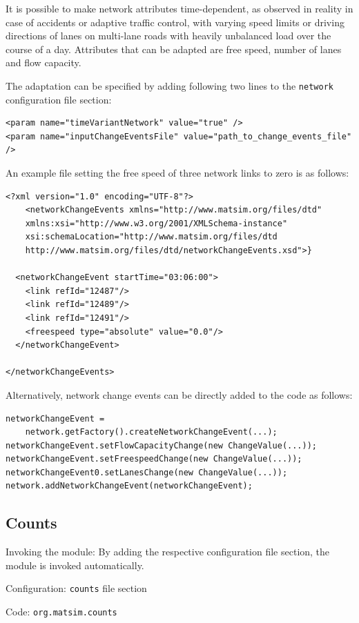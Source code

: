 It is possible to make network attributes time-dependent, as observed in reality in case of accidents or adaptive traffic control, with varying speed limits or driving directions of lanes on multi-lane roads with heavily unbalanced load over the course of a day. Attributes that can be adapted are free speed, number of lanes and flow capacity.

The adaptation can be specified by adding following two lines to the \lstinline|network| configuration file section:
\begin{lstlisting}
<param name="timeVariantNetwork" value="true" />
<param name="inputChangeEventsFile" value="path_to_change_events_file" />
\end{lstlisting}
%
An example file setting the free speed of three network links to zero is as follows:
%
\begin{lstlisting}
<?xml version="1.0" encoding="UTF-8"?>
	<networkChangeEvents xmlns="http://www.matsim.org/files/dtd"
	xmlns:xsi="http://www.w3.org/2001/XMLSchema-instance"
	xsi:schemaLocation="http://www.matsim.org/files/dtd
	http://www.matsim.org/files/dtd/networkChangeEvents.xsd">}

  <networkChangeEvent startTime="03:06:00">
    <link refId="12487"/>
    <link refId="12489"/>
    <link refId="12491"/>
    <freespeed type="absolute" value="0.0"/>
  </networkChangeEvent>

</networkChangeEvents>
\end{lstlisting}
%
Alternatively, network change events can be directly added to the code as follows:
\begin{lstlisting}
networkChangeEvent =
	network.getFactory().createNetworkChangeEvent(...);
networkChangeEvent.setFlowCapacityChange(new ChangeValue(...));
networkChangeEvent.setFreespeedChange(new ChangeValue(...));
networkChangeEvent0.setLanesChange(new ChangeValue(...));
network.addNetworkChangeEvent(networkChangeEvent);
\end{lstlisting}

\subsection{Counts}
\label{sec:counts}
\begin{compactitem}
\item Invoking the module: By adding the respective configuration file section, the module is invoked automatically.
\item Configuration: \lstinline|counts| file section
\item Code: \lstinline|org.matsim.counts|
\end{compactitem}


